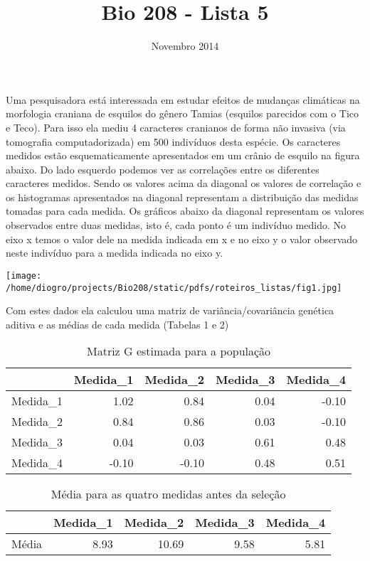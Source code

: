 \documentclass[portuges,]{article}
\title{Bio 208 - Lista 5}
\author{}
\date{Novembro 2014}
\begin{document}
\maketitle


Uma pesquisadora está interessada em estudar efeitos de mudanças
climáticas na morfologia craniana de esquilos do gênero Tamias (esquilos
parecidos com o Tico e Teco). Para isso ela mediu 4 caracteres cranianos
de forma não invasiva (via tomografia computadorizada) em 500 indivíduos
desta espécie. Os caracteres medidos estão esquematicamente apresentados
em um crânio de esquilo na figura abaixo. Do lado esquerdo podemos ver
as correlações entre os diferentes caracteres medidos. Sendo os valores
acima da diagonal os valores de correlação e os histogramas apresentados
na diagonal representam a distribuição das medidas tomadas para cada
medida. Os gráficos abaixo da diagonal representam os valores observados
entre duas medidas, isto é, cada ponto é um indivíduo medido. No eixo x
temos o valor dele na medida indicada em x e no eixo y o valor observado
neste indivíduo para a medida indicada no eixo y.

\texttt{[image: /home/diogro/projects/Bio208/static/pdfs/roteiros\_listas/fig1.jpg]}

Com estes dados ela calculou uma matriz de variância/covariância
genética aditiva e as médias de cada medida (Tabelas 1 e 2)

\begin{table}[ht]
\centering
\begin{tabular}{rrrrr}
  \toprule
 & Medida\_1 & Medida\_2 & Medida\_3 & Medida\_4 \\ 
  \midrule
Medida\_1 & 1.02 & 0.84 & 0.04 & -0.10 \\ 
  Medida\_2 & 0.84 & 0.86 & 0.03 & -0.10 \\ 
  Medida\_3 & 0.04 & 0.03 & 0.61 & 0.48 \\ 
  Medida\_4 & -0.10 & -0.10 & 0.48 & 0.51 \\ 
   \bottomrule
\end{tabular}
\caption{Matriz G estimada para a população} 
\end{table}\begin{table}[ht]
\centering
\begin{tabular}{rrrrr}
  \toprule
 & Medida\_1 & Medida\_2 & Medida\_3 & Medida\_4 \\ 
  \midrule
Média & 8.93 & 10.69 & 9.58 & 5.81 \\ 
   \bottomrule
\end{tabular}
\caption{Média para as quatro medidas antes da seleção} 
\end{table}
\end{document}
